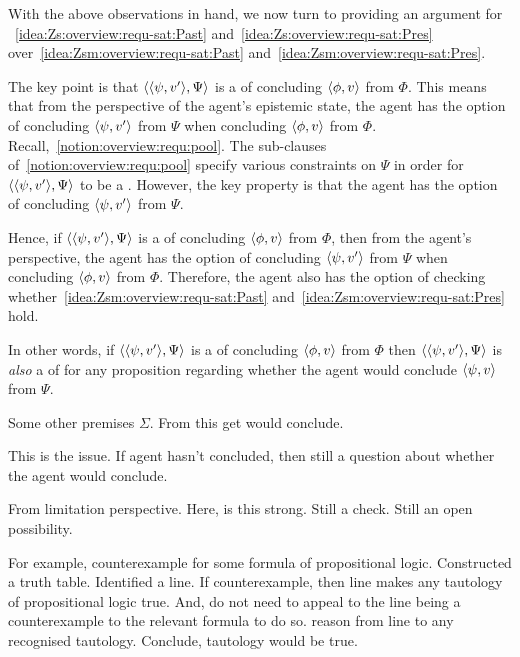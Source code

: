 \begin{note}[Argument]
  With the above observations in hand, we now turn to providing an argument for ~\ref{idea:Zs:overview:requ-sat:Past} and~\ref{idea:Zs:overview:requ-sat:Pres} over~\ref{idea:Zsm:overview:requ-sat:Past} and~\ref{idea:Zsm:overview:requ-sat:Pres}.

  The key point is that \(\langle \langle \psi, v' \rangle, \Psi \rangle\) is a \requ{} of concluding \(\langle \phi, v \rangle\) from \(\Phi\).
  This means that from the perspective of the agent's epistemic state, the agent has the option of concluding \(\langle \psi, v' \rangle\) from \(\Psi\) when concluding \(\langle \phi, v \rangle\) from \(\Phi\).
  Recall,~\ref{notion:overview:requ:pool}.
  The sub-clauses of~\ref{notion:overview:requ:pool} specify various constraints on \(\Psi\) in order for \(\langle \langle \psi, v' \rangle, \Psi \rangle\) to be a \requ{}.
  However, the key property is that the agent has the option of concluding \(\langle \psi, v' \rangle\) from \(\Psi\).

  Hence, if \(\langle \langle \psi, v' \rangle, \Psi \rangle\) is a \requ{} of concluding \(\langle \phi, v \rangle\) from \(\Phi\), then from the agent's perspective, the agent has the option of concluding \(\langle \psi, v' \rangle\) from \(\Psi\) when concluding \(\langle \phi, v \rangle\) from \(\Phi\).
  Therefore, the agent also has the option of checking whether~\ref{idea:Zsm:overview:requ-sat:Past} and~\ref{idea:Zsm:overview:requ-sat:Pres} hold.

  In other words, if \(\langle \langle \psi, v' \rangle, \Psi \rangle\) is a \requ{} of concluding \(\langle \phi, v \rangle\) from \(\Phi\) then \(\langle \langle \psi, v' \rangle, \Psi \rangle\) is \emph{also }a \requ{} of for any proposition regarding whether the agent would conclude \(\langle \psi, v \rangle\) from \(\Psi\).

  Some other premises \(\Sigma\).
  From this get would conclude.

  This is the issue.
  If agent hasn't concluded, then still a question about whether the agent would conclude.

  From limitation perspective.
  Here, \csN{} is this strong.
  Still a check.
  Still an open possibility.
\end{note}

\begin{note}
  For example, counterexample for some formula of propositional logic.
  Constructed a truth table.
  Identified a line.
  If counterexample, then line makes any tautology of propositional logic true.
  And, do not need to appeal to the line being a counterexample to the relevant formula to do so.
  reason from line to any recognised tautology.
  Conclude, tautology would be true.
\end{note}

